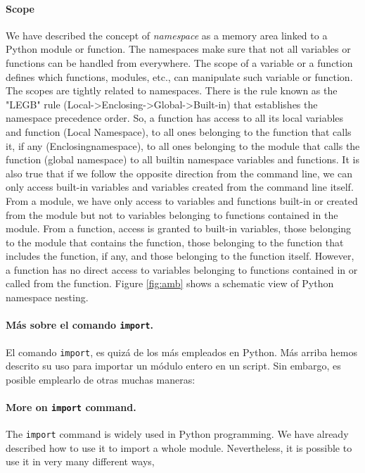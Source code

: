 \begin{paracol}{2}
\paragraph{Scope}  We have described the concept of \emph{namespace} as a memory area linked to a Python module or function. The namespaces make sure that not all variables or functions can be handled from everywhere. The scope of a variable or a function defines which functions, modules, etc., can manipulate such variable or function. The scopes are tightly related to namespaces. There is the rule known as the "LEGB" rule (Local->Enclosing->Global->Built-in) that establishes the namespace precedence order. So, a function has access to all its local variables and function (Local Namespace), to all ones belonging to the function that calls it, if any  (Enclosingnamespace), to all ones belonging to the module that calls the function (global namespace) to all builtin namespace variables and functions. It is also true that if we follow the opposite direction from the command line, we can only access built-in variables and variables created from the command line itself. From a module, we have only access to variables and functions built-in or created from the module but not to variables belonging to functions contained in the module.
From a function, access is granted to built-in variables, those belonging to the module that contains the function, those belonging to the function that includes the function, if any, and those belonging to the function itself. However, a function has no direct access to variables belonging to functions contained in or called from the function.
Figure \ref{fig:amb} shows a schematic view of Python namespace nesting.
\switchcolumn
\paragraph{Más sobre el comando \texttt{import}.} El comando \texttt{import}, es quizá de los más empleados en Python. Más arriba hemos descrito su uso para importar un módulo entero en un script. Sin embargo, es posible emplearlo de otras muchas maneras:
\switchcolumn
\paragraph{More on \texttt{import} command.} The \texttt{import} command is widely used in Python programming. We have already described how to use it to import a whole module. Nevertheless, it is possible to use it in very many different ways,
\end{paracol}

